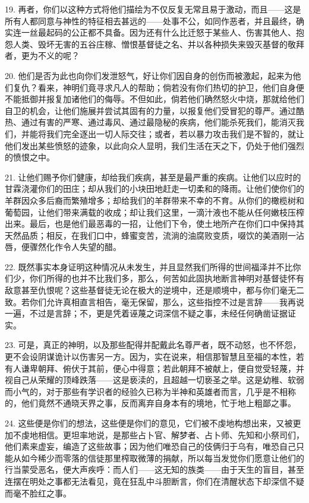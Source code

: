 19. 再者，你们以这种方式将他们描绘为不仅反复无常且易于激动，而且——这是所有人都同意与神性的特征相去甚远的——处事不公，如同作恶者，并且最终，确实连一丝最起码的公正都不具备。因为还有什么比迁怒于某些人、伤害其他人、抱怨人类、毁坏无害的五谷庄稼、憎恨基督徒之名、并以各种损失来毁灭基督的敬拜者，更为不义的呢？\par

20. 他们是否为此也向你们发泄怒气，好让你们因自身的创伤而被激起，起来为他们复仇？看来，神明们竟寻求凡人的帮助；倘若没有你们热切的护卫，他们自身便不能抵御并报复加诸他们的侮辱。不但如此，倘若他们确然怒火中烧，那就给他们自卫的机会，让他们施展并尝试其固有的力量，以报复他们受冒犯的尊严。通过酷热、通过有害的严寒、通过毒风、通过最隐秘的疾病，他们能杀死我们，能消灭我们，并能将我们完全逐出一切人际交往；或者，若以暴力攻击我们是不智的，就让他们发出某些愤怒的迹象，以此向众人显明，我们生活在天之下，仍处于他们强烈的愤恨之中。\par

21. 让他们赐予你们健康，却给我们疾病，甚至是最严重的疾病。让他们以应时的甘霖浇灌你们的田庄；却从我们的小块田地赶走一切柔和的降雨。让他们使你们的羊群因众多后裔而繁殖增多；却给我们的羊群带来不幸的不育。从你们的橄榄树和葡萄园，让他们带来满载的收成；却让我们这里，一滴汁液也不能从任何嫩枝压榨出来。最后，也是他们最恶毒的一招，让他们下令，使土地所产在你们口中保持其天然品质；相反，在我们口中，蜂蜜变苦，流淌的油腐败变质，啜饮的美酒刚一沾唇，便骤然化作令人失望的醋。\par

22. 既然事实本身证明这种情况从未发生，并且显然我们所得的世间福泽并不比你们少，你们所得的也并不比我们多，那么，何苦如此固执地断言神明对基督徒怀有敌意甚至仇恨呢？这些基督徒无论在极大的逆境中，还是顺境中，都与你们毫无二致。若你们允许真相直言相告，毫无保留，那么，这些指控不过是言辞——我再说一遍，不过是言辞；不，更是凭着诬蔑之词深信不疑之事，未经任何确凿证据证实。\par

23. 可是，真正的神明，以及那些配得并配戴此名尊严者，既不动怒，也不怀怨，更不会设阴谋诡计以伤害另一方。因为，实在说来，相信那智慧且至福的本性，若有人谦卑朝拜、俯伏于其前，便心中得意；若此朝拜不被献上，便自觉受轻蔑，并视自己从荣耀的顶峰跌落——这是亵渎的，且超越一切亵圣之举。这是幼稚、软弱而小气的，对于那些有学识者的经验久已称为半神和英雄者而言，几乎是不相称的，他们竟然不通晓天界之事，反而离弃自身本有的境地，忙于地上粗鄙之事。\par

24. 这些便是你们的想法，这些便是你们的意见，它们被不虔地构想出来，又被更加不虔地相信。更坦率地说，是那些占卜官、解梦者、占卜师、先知和小祭司们，他们素来虚妄，编造了这些故事；因为他们唯恐自己的伎俩归于乌有，唯恐自己只能从如今稀少而零落的信徒那里榨取微薄的捐献，所以每当发觉你们愿意让他们的行当蒙受恶名，便大声疾呼：而人们——这无知的族类——由于天生的盲目，甚至连摆在明处之事都无法看见，竟在狂乱中斗胆断言，你们在清醒状态下却深信不疑而毫不脸红之事。\par


